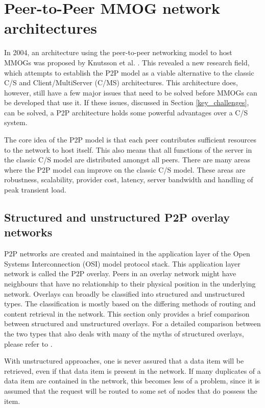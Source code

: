 \documentclass[10pt,a4paper,journal,cspaper,compsoc]{IEEEtran}
\begin{document}
\section{Peer-to-Peer MMOG network architectures}
\label{p2p_network_architectures}

In 2004, an architecture using the peer-to-peer networking model to host MMOGs was proposed by Knutsson et al. \cite{knutsson_p2p_first}. This
revealed a new research field, which attempts to establish the P2P model as a viable alternative to the classic C/S and Client/MultiServer (C/MS)
architectures. This architecture does, however, still have a few major issues that need to be solved before MMOGs can be developed that use it. If
these issues, discussed in Section \ref{key_challenges}, can be solved, a P2P architecture holds some powerful advantages over a C/S system.

The core idea of the P2P model is that each peer contributes sufficient resources to the network to host itself. This also means that all functions
of the server in the classic C/S model are distributed amongst all peers. There are many areas where the P2P model can improve on the classic C/S
model. These areas are robustness, scalability, provider cost, latency, server bandwidth and handling of peak transient load.

\subsection{Structured and unstructured P2P overlay networks}
\label{overlays}

P2P networks are created and maintained in the application layer of the Open Systems Interconnection (OSI) model protocol stack. This application
layer network is called the P2P overlay. Peers in an overlay network might have neighbours that have no relationship to their physical position in
the underlying network. Overlays can broadly be classified into structured and unstructured types. The classification is mostly based on the
differing methods of routing and content retrieval in the network. This section only provides a brief comparison between structured and unstructured
overlays. For a detailed comparison between the two types that also deals with many of the myths of structured overlays, please refer to
\cite{Castro_structured_overlay_myths}.

With unstructured approaches, one is never assured that a data item will be retrieved, even if that data item is present in the network. If many
duplicates of a data item are contained in the network, this becomes less of a problem, since it is assumed that the request will be routed to some
set of nodes that do  possess the item.
\end{document}
